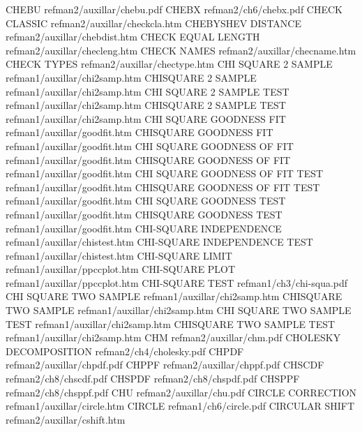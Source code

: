 CHEBU                                   refman2/auxillar/chebu.pdf
CHEBX                                   refman2/ch6/chebx.pdf
CHECK CLASSIC                           refman2/auxillar/checkcla.htm
CHEBYSHEV DISTANCE                      refman2/auxillar/chebdist.htm
CHECK EQUAL LENGTH                      refman2/auxillar/checleng.htm
CHECK NAMES                             refman2/auxillar/checname.htm
CHECK TYPES                             refman2/auxillar/chectype.htm
CHI SQUARE 2 SAMPLE                     refman1/auxillar/chi2samp.htm
CHISQUARE 2 SAMPLE                      refman1/auxillar/chi2samp.htm
CHI SQUARE 2 SAMPLE TEST                refman1/auxillar/chi2samp.htm
CHISQUARE 2 SAMPLE TEST                 refman1/auxillar/chi2samp.htm
CHI SQUARE GOODNESS FIT                 refman1/auxillar/goodfit.htm
CHISQUARE GOODNESS FIT                  refman1/auxillar/goodfit.htm
CHI SQUARE GOODNESS OF FIT              refman1/auxillar/goodfit.htm
CHISQUARE GOODNESS OF FIT               refman1/auxillar/goodfit.htm
CHI SQUARE GOODNESS OF FIT TEST         refman1/auxillar/goodfit.htm
CHISQUARE GOODNESS OF FIT TEST          refman1/auxillar/goodfit.htm
CHI SQUARE GOODNESS TEST                refman1/auxillar/goodfit.htm
CHISQUARE GOODNESS TEST                 refman1/auxillar/goodfit.htm
CHI-SQUARE INDEPENDENCE                 refman1/auxillar/chistest.htm
CHI-SQUARE INDEPENDENCE TEST            refman1/auxillar/chistest.htm
CHI-SQUARE LIMIT                        refman1/auxillar/ppccplot.htm
CHI-SQUARE PLOT                         refman1/auxillar/ppccplot.htm
CHI-SQUARE TEST                         refman1/ch3/chi-squa.pdf
CHI SQUARE TWO SAMPLE                   refman1/auxillar/chi2samp.htm
CHISQUARE TWO SAMPLE                    refman1/auxillar/chi2samp.htm
CHI SQUARE TWO SAMPLE TEST              refman1/auxillar/chi2samp.htm
CHISQUARE TWO SAMPLE TEST               refman1/auxillar/chi2samp.htm
CHM                                     refman2/auxillar/chm.pdf
CHOLESKY DECOMPOSITION                  refman2/ch4/cholesky.pdf
CHPDF                                   refman2/auxillar/chpdf.pdf
CHPPF                                   refman2/auxillar/chppf.pdf
CHSCDF                                  refman2/ch8/chscdf.pdf
CHSPDF                                  refman2/ch8/chspdf.pdf
CHSPPF                                  refman2/ch8/chsppf.pdf
CHU                                     refman2/auxillar/chu.pdf
CIRCLE CORRECTION                       refman1/auxillar/circle.htm
CIRCLE                                  refman1/ch6/circle.pdf
CIRCULAR SHIFT                          refman2/auxillar/cshift.htm
